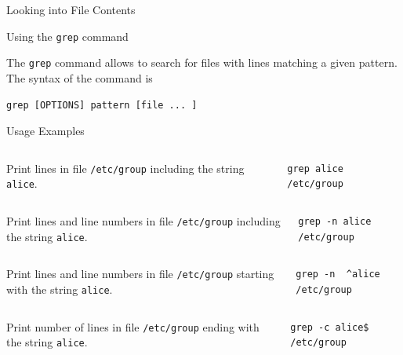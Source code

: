 \begin{frame}[t,fragile]{Looking into File Contents}

  \vspace{-0.3cm}
  \begin{block}{Using the \alert{\texttt{grep}} command}
    {\footnotesize
The \alert{\texttt{grep}} command allows to search for files with lines matching a
given pattern.  The syntax of the command is


        \begin{lstlisting}
grep [OPTIONS] pattern [file ... ]
        \end{lstlisting}

  Usage Examples
}


\vspace{0.1cm}
{\scriptsize
  \begin{columns}
      Print lines in file \texttt{/etc/group} including the string \texttt{alice}.
        \begin{lstlisting}
grep alice /etc/group
        \end{lstlisting}
    \end{columns}
 \begin{columns}
      Print lines and line numbers in file \texttt{/etc/group} including the string \texttt{alice}.
        \begin{lstlisting}
grep -n alice /etc/group
        \end{lstlisting}
    \end{columns}
 \begin{columns}
      Print lines and line numbers in file \texttt{/etc/group} starting with the string \texttt{alice}.
        \begin{lstlisting}
grep -n  ^alice /etc/group
        \end{lstlisting}
    \end{columns}
 \begin{columns}
      Print number of lines in file \texttt{/etc/group} ending with the string \texttt{alice}.
        \begin{lstlisting}
grep -c alice$ /etc/group
        \end{lstlisting} %
    \end{columns}
}  
  \end{block}
\end{frame}
